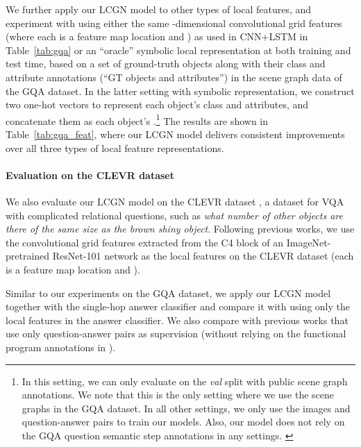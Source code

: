\documentclass[10pt,twocolumn,letterpaper]{article}
\begin{document}
We further apply our LCGN model to other types of local features, and experiment with using either the same -dimensional convolutional grid features (where each  is a feature map location and ) as used in CNN+LSTM in Table~\ref{tab:gqa} or an ``oracle'' symbolic local representation at both training and test time, based on a set of ground-truth objects along with their class and attribute annotations (``GT objects and attributes'') in the scene graph data of the GQA dataset. In the latter setting with symbolic representation, we construct two one-hot vectors to represent each object's class and attributes, and concatenate them as each object's .\footnote{In this setting, we can only evaluate on the \textit{val} split with public scene graph annotations. We note that this is the only setting where we use the scene graphs in the GQA dataset. In all other settings, we only use the images and question-answer pairs to train our models. Also, our model does not rely on the GQA question semantic step annotations in any settings. \label{fn:gqa_sg}} The results are shown in Table~\ref{tab:gqa_feat}, where our LCGN model delivers consistent improvements over all three types of local feature representations.

\vspace{-1em}
\paragraph{Evaluation on the CLEVR dataset} We also evaluate our LCGN model on the CLEVR dataset \cite{johnson2017clevr}, a dataset for VQA with complicated relational questions, such as \textit{what number of other objects are there of the same size as the brown shiny object}. Following previous works, we use the  convolutional grid features extracted from the C4 block of an ImageNet-pretrained ResNet-101 network \cite{he2016deep} as the local features  on the CLEVR dataset (\ie each  is a feature map location and ).

Similar to our experiments on the GQA dataset, we apply our LCGN model together with the single-hop answer classifier and compare it with using only the local features in the answer classifier. We also compare with previous works that use only question-answer pairs as supervision (\ie without relying on the functional program annotations in \cite{johnson2017clevr}).
\end{document}
